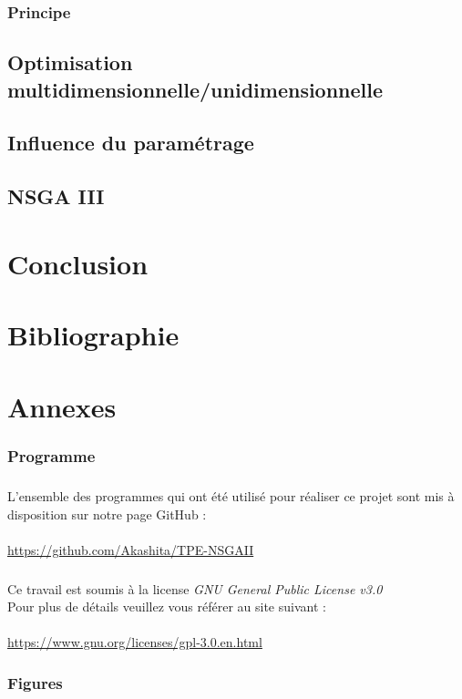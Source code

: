 \documentclass[12pt]{report}
\begin{document}
      \subsection{Principe}
    \section{Optimisation multidimensionnelle/unidimensionnelle}
    \section{Influence du paramétrage}
    \section{NSGA III}


  \chapter{Conclusion}

  \appendix

  \chapter{Bibliographie}
  \nocite{*} %
  
  

  \chapter{Annexes}
    \subsection{Programme}
      \paragraph{}
      L'ensemble des programmes qui ont été utilisé pour réaliser ce projet sont mis à disposition sur notre page GitHub : \\\\
      \url{https://github.com/Akashita/TPE-NSGAII}

      \paragraph{}
      Ce travail est soumis à la license \emph{GNU General Public License v3.0}\\ %
      Pour plus de détails veuillez vous référer au site suivant : \\\\
      \url{https://www.gnu.org/licenses/gpl-3.0.en.html}

    \subsection{Figures}
\end{document}
